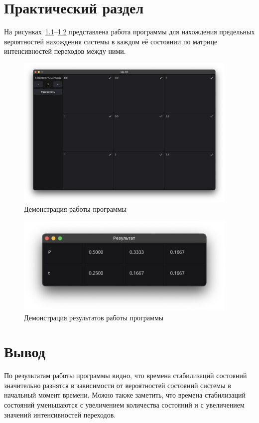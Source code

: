 \chapter{Практический раздел}

На рисунках~\ref{fig:screen}--\ref{fig:result} представлена работа программы для
нахождения предельных вероятностей нахождения системы в каждом
её состоянии по матрице интенсивностей переходов между ними.

\begin{figure}[ht]
    \centering
    \includegraphics[width=0.95\textwidth]{assets/screen.jpeg}
    \caption{Демонстрация работы программы}
    \label{fig:screen}
\end{figure}

\begin{figure}[ht]
    \centering
    \includegraphics[width=0.95\textwidth]{assets/result.jpeg}
    \caption{Демонстрация результатов работы программы}
    \label{fig:result}
\end{figure}

\chapter{Вывод}

По результатам работы программы видно, что времена стабилизаций состояний значительно разнятся в зависимости от вероятностей состояний системы в начальный момент времени. Можно также заметить, что времена стабилизаций состояний уменьшаются с увеличением количества состояний и с увеличением значений интенсивностей переходов.

